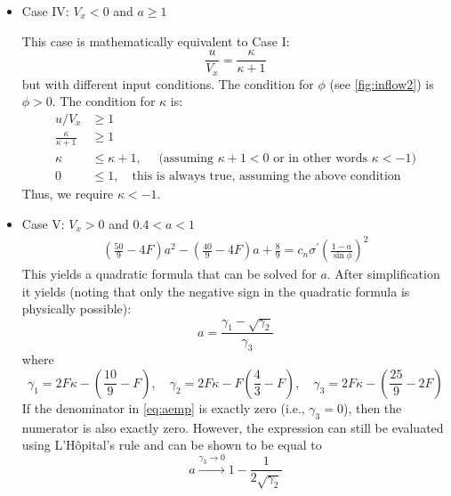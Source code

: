 \documentclass{article}
\begin{document}
\begin{itemize}
\item Case IV: $V_x < 0$ and $a \ge 1$

This case is mathematically equivalent to Case I:
\begin{equation}
    \frac{u}{V_x} = \frac{\kappa}{\kappa + 1}
\end{equation}
but with different input conditions.
The condition for $\phi$ (see \cref{fig:inflow2}) is $\phi > 0$.  The condition for $\kappa$ is:
\begin{equation}
    \begin{aligned}
        u/V_x &\ge 1\\
        \frac{\kappa}{\kappa + 1} &\ge 1\\
        \kappa &\le \kappa + 1,\quad \text{ (assuming $\kappa + 1 < 0$ or in other words $\kappa < -1$)} \\
        0 &\le 1,\quad \text{this is always true, assuming the above condition}
    \end{aligned}
\end{equation}
Thus, we require $\kappa < -1$.

\item Case V: $V_x > 0$ and $0.4 < a < 1$
\begin{equation}
\begin{aligned}
\left(\frac{50}{9} - 4F\right) a^2 - \left(\frac{40}{9} - 4F\right) a + \frac{8}{9} = c_n \sigma^\prime \left(\frac{1-a}{\sin\phi}\right)^2
\end{aligned}
\end{equation}
This yields a quadratic formula that can be solved for $a$.  After simplification it yields (noting that only the negative sign in the quadratic formula is physically possible):
\begin{equation}
a = \frac{\gamma_1 - \sqrt{\gamma_2}}{\gamma_3}
\label{eq:aemp}
\end{equation}
where
\begin{equation}
\gamma_1 = 2F\kappa - \left(\frac{10}{9} - F\right)\!, \quad \gamma_2 = 2F\kappa - F\left(\frac{4}{3} - F\right)\!,\quad
\gamma_3 = 2F\kappa - \left(\frac{25}{9} - 2F\right)
\label{eq:gamma}
\end{equation}
If the denominator in \cref{eq:aemp} is exactly zero (i.e., $\gamma_3 = 0$), then the numerator is also exactly zero.  However, the expression can still be evaluated using L'H\^{o}pital's rule and can be shown to be equal to
\begin{equation}
    a \xrightarrow{\gamma_3 \to 0} 1 - \frac{1}{2\sqrt{\gamma_2}}
    \label{eq:aconverge}
\end{equation}


\end{itemize}
\end{document}
